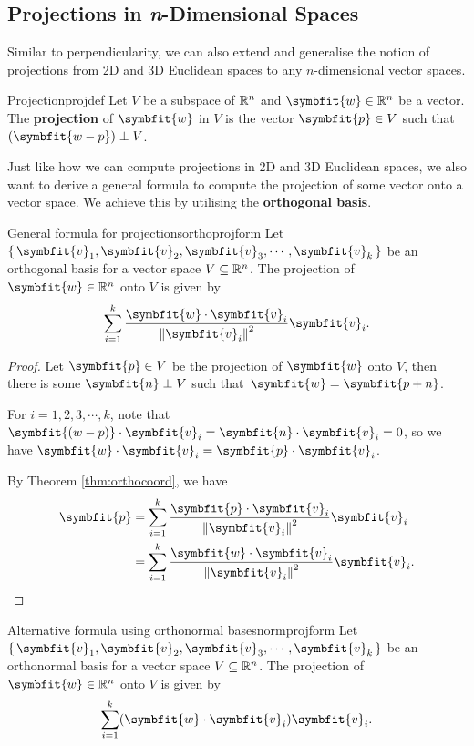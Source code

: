 \documentclass[math]{amznotes}
\theoremstyle{remark}
\begin{document}
\subsection{Projections in \textit{n}-Dimensional Spaces}
Similar to perpendicularity, we can also extend and generalise the notion of projections from 2D and 3D Euclidean spaces to any $n$-dimensional vector spaces.
\begin{dfnbox}{Projection}{projdef}
    Let $V$ be a subspace of $\mathbb{R}^n$ and $\symbfit{w} \in \R^n$ be a vector. The {\color{red} \textbf{projection}} of $\symbfit{w}$ in $V$ is the vector $\symbfit{p} \in V$ such that $(\symbfit{w - p}) \perp V$.
\end{dfnbox}
Just like how we can compute projections in 2D and 3D Euclidean spaces, we also want to derive a general formula to compute the projection of some vector onto a vector space. We achieve this by utilising the {\color{red} \textbf{orthogonal basis}}.
\begin{thmbox}{General formula for projections}{orthoprojform}
    Let $\left\{\, \symbfit{v}_1, \symbfit{v}_2, \symbfit{v}_3, \cdots, \symbfit{v}_k \,\right\}$ be an orthogonal basis for a vector space $V \subseteq \mathbb{R}^n$. The projection of $\symbfit{w} \in \R^n$ onto $V$ is given by
    \begin{displaymath}
        \sum_{i = 1}^{k} \frac{\symbfit{w} \cdot \symbfit{v}_i}{\left\lVert \symbfit{v}_i \right\rVert^2}\symbfit{v}_i.
    \end{displaymath}
    \tcblower
    \begin{proof}
        Let $\symbfit{p} \in V$ be the projection of $\symbfit{w}$ onto $V$, then there is some $\symbfit{n} \perp V$ such that~$\symbfit{w} = \symbfit{p + n}$.

        For $i = 1, 2, 3, \cdots, k$, note that $\symbfit{(w - p)} \cdot \symbfit{v}_i = \symbfit{n} \cdot \symbfit{v}_i = 0$, so we have $\symbfit{w} \cdot \symbfit{v}_i = \symbfit{p} \cdot \symbfit{v}_i$.

        By Theorem \ref{thm:orthocoord}, we have
        \begin{align*}
            \symbfit{p} & = \sum_{i = 1}^{k} \frac{\symbfit{p} \cdot \symbfit{v}_i}{\left\lVert \symbfit{v}_i \right\rVert^2}\symbfit{v}_i  \\
                        & = \sum_{i = 1}^{k} \frac{\symbfit{w} \cdot \symbfit{v}_i}{\left\lVert \symbfit{v}_i \right\rVert^2}\symbfit{v}_i.
        \end{align*}
    \end{proof}
\end{thmbox}
\begin{corbox}{Alternative formula using orthonormal bases}{normprojform}
    Let $\left\{\, \symbfit{v}_1, \symbfit{v}_2, \symbfit{v}_3, \cdots, \symbfit{v}_k \,\right\}$ be an orthonormal basis for a vector space $V \subseteq \mathbb{R}^n$. The projection of $\symbfit{w} \in \R^n$ onto $V$ is given by
    \begin{displaymath}
        \sum_{i = 1}^{k} (\symbfit{w} \cdot \symbfit{v}_i)\symbfit{v}_i.
    \end{displaymath}
\end{corbox}
\end{document}
